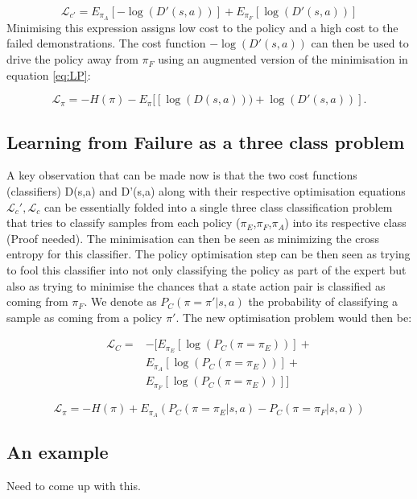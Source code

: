 \documentclass[letterpaper, 10 pt, conference]{ieeeconf}
\begin{document}
\[
\mathcal{L}_{c'} = E_{\pi_A}[-\log(D'(s,a))] + E_{\pi_F}[\log(D'(s,a))] \label{eq:LCp}
\]
Minimising this expression assigns low cost to the policy and a high cost to the failed demonstrations. The cost function 
$-\log(D'(s,a))$ can then be used to drive the policy away from $\pi_F$ using an augmented version of the minimisation in equation \ref{eq:LP}:

\[
\mathcal{L}_{\pi} = -H(\pi) - E_{\pi}[[\log(D(s,a))) + \log(D'(s,a))].  \label{eq:LPaug}
\]

\subsection{Learning from Failure as a three class problem}

A key observation that can be made now is that the two cost functions (classifiers) D(s,a) and D'(s,a) along with their respective optimisation equations $\mathcal{L}_c',\mathcal{L}_c$ can be essentially folded into a single three class classification problem that tries to classify samples from each policy ($\pi_E$,$\pi_F$,$\pi_A$) into its respective class (Proof needed). The minimisation can then be seen as minimizing the cross entropy for this classifier. The policy optimisation step can be then seen as trying to fool this classifier into not only classifying the policy as part of the expert but also as trying to minimise the chances that a state action pair is classified as coming from $\pi_F$. We denote as $P_C(\pi=\pi'|s,a)$ the probability of classifying a sample as coming from a policy $\pi'$. The new optimisation problem would then be:

\begin{align}
    \mathcal{L}_C = & -\Big[ E_{\pi_E}[\log(P_C(\pi=\pi_E))] +\\ &E_{\pi_A}[\log(P_C(\pi=\pi_E))] +\\ &E_{\pi_F}[\log(P_C(\pi=\pi_E))]\Big]  
\end{align}

\[
    \mathcal{L_\pi} = -H(\pi) + E_{\pi_A}(P_C(\pi=\pi_E|s,a) - P_C(\pi=\pi_F|s,a)) 
\]

\subsection{An example}

Need to come up with this. 















\end{document}
